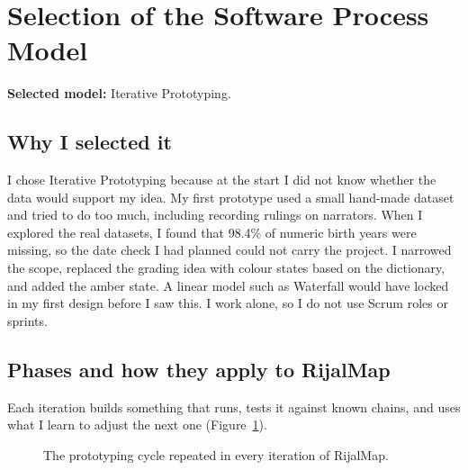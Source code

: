 \documentclass[11pt,a4paper]{article}
\begin{document}
\section{Selection of the Software Process Model}
\textbf{Selected model:} Iterative Prototyping.

\subsection{Why I selected it}
I chose Iterative Prototyping because at the start I did not know whether the data would support my idea. My first prototype used a small hand-made dataset and tried to do too much, including recording rulings on narrators. When I explored the real datasets, I found that 98.4\% of numeric birth years were missing, so the date check I had planned could not carry the project. I narrowed the scope, replaced the grading idea with colour states based on the dictionary, and added the amber state. A linear model such as Waterfall would have locked in my first design before I saw this. I work alone, so I do not use Scrum roles or sprints.

\subsection{Phases and how they apply to RijalMap}
Each iteration builds something that runs, tests it against known chains, and uses what I learn to adjust the next one (Figure~\ref{fig:cycle}).

\begin{figure}[H]
\centering
{}
\caption{The prototyping cycle repeated in every iteration of RijalMap.}
\label{fig:cycle}
\end{figure}
\end{document}
